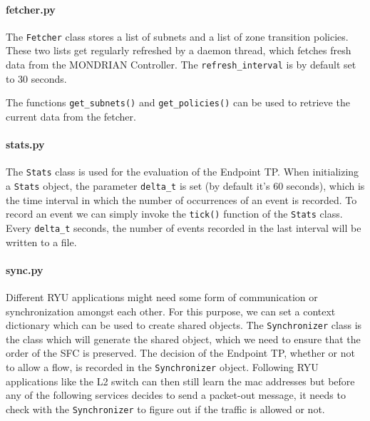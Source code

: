 \paragraph{fetcher.py} The \texttt{Fetcher} class stores a list of subnets and a list of zone transition policies. These two lists get regularly refreshed by a daemon thread, which fetches fresh data from the MONDRIAN Controller. The \texttt{refresh\_interval} is by default set to 30 seconds. 

The functions \texttt{get\_subnets()} and \texttt{get\_policies()} can be used to retrieve the current data from the fetcher. 

\paragraph{stats.py} The \texttt{Stats} class is used for the evaluation of the Endpoint \acs{TP}. When initializing a \texttt{Stats} object, the parameter \texttt{delta\_t} is set (by default it's 60 seconds), which is the time interval in which the number of occurrences of an event is recorded. To record an event we can simply invoke the \texttt{tick()} function of the \texttt{Stats} class. Every \texttt{delta\_t} seconds, the number of events recorded in the last interval will be written to a file.

\paragraph{sync.py} Different RYU applications might need some form of communication or synchronization amongst each other. For this purpose, we can set a context dictionary which can be used to create shared objects. The \texttt{Synchronizer} class is the class which will generate the shared object, which we need to ensure that the order of the \acs{SFC} is preserved. The decision of the Endpoint \acs{TP}, whether or not to allow a flow, is recorded in the \texttt{Synchronizer} object. Following RYU applications like the L2 switch can then still learn the mac addresses but before any of the following services decides to send a packet-out message, it needs to check with the \texttt{Synchronizer} to figure out if the traffic is allowed or not.

